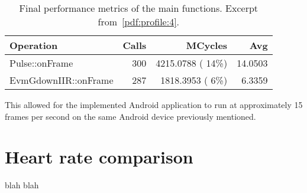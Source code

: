 \begin{table}
  \centering
  \begin{tabular}{lrrr}
    \hline
    Operation & Calls & MCycles & Avg \\
    \hline
    Pulse::onFrame       & 300 & 4215.0788 ( 14\%) & 14.0503 \\
    EvmGdownIIR::onFrame & 287 & 1818.3953 (  6\%) &  6.3359 \\
    \hline
  \end{tabular}
  \caption{
    Final performance metrics of the main functions.
    Excerpt from~\ref{pdf:profile:4}.
  }
  \label{tab:profile:final}
\end{table}

This allowed for the implemented Android application to run at approximately
15 frames per second on the same Android device previously mentioned.

\pagebreak

\section{Heart rate comparison} \label{sec:results:heart}


blah blah


